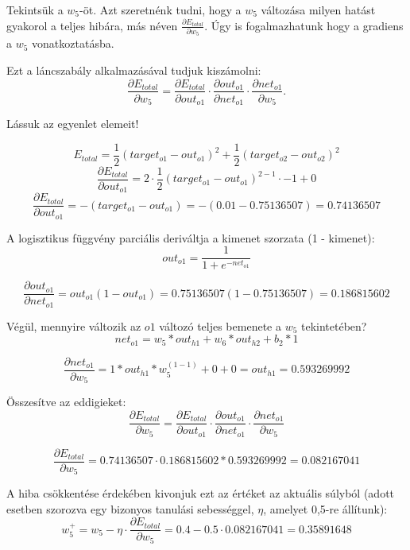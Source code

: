 Tekintsük a $w_5$-öt. Azt szeretnénk tudni, hogy a $w_5$ változása milyen hatást gyakorol a teljes hibára, más néven $\frac{\partial E_ {total}}{\partial w_ {5}}$. Úgy is fogalmazhatunk hogy a gradiens a $w_5$ vonatkoztatásba.

Ezt a láncszabály alkalmazásával tudjuk kiszámolni:
$$
\frac{\partial E_{total}}{\partial w_{5}} = \frac{\partial E_{total}}{\partial out_{o1}} \cdot \frac{\partial out_{o1}}{\partial net_{o1}} \cdot \frac{\partial net_{o1}}{\partial w_{5}}.
$$

Lássuk az egyenlet elemeit!
\begin{flushleft}
\begin{equation}
E_{total} = \frac{1}{2}(target_{o1} - out_{o1})^{2} + \frac{1}{2}(target_{o2} - out_{o2})^{2}
\end{equation}
\begin{equation}
\frac{\partial E_{total}}{\partial out_{o1}} = 2 \cdot \frac{1}{2}(target_{o1} - out_{o1})^{2 - 1} \cdot -1 + 0
\end{equation}
\begin{equation}
\frac{\partial E_{total}}{\partial out_{o1}} = -(target_{o1} - out_{o1}) = -(0.01 - 0.75136507) = 0.74136507
\end{equation}

\end{flushleft}

A logisztikus függvény parciális deriváltja a kimenet szorzata (1 - kimenet):
$$
out_{o1} = \frac{1}{1+e^{-net_{o1}}}
$$

$$
\frac{\partial out_{o1}}{\partial net_{o1}} = out_{o1}(1 - out_{o1}) = 0.75136507(1 - 0.75136507) = 0.186815602
$$

Végül, mennyire változik az $o1$ változó teljes bemenete a $w_5$ tekintetében?
$$
net_{o1} = w_5 * out_{h1} + w_6 * out_{h2} + b_2 * 1
$$

$$
\frac{\partial net_{o1}}{\partial w_{5}} = 1 * out_{h1} * w_5^{(1 - 1)} + 0 + 0 = out_{h1} = 0.593269992
$$

Összesítve az eddigieket:
$$
\frac{\partial E_{total}}{\partial w_{5}} = \frac{\partial E_{total}}{\partial out_{o1}} \cdot \frac{\partial out_{o1}}{\partial net_{o1}} \cdot \frac{\partial net_{o1}}{\partial w_{5}}
$$

$$
\frac{\partial E_{total}}{\partial w_{5}} = 0.74136507 \cdot 0.186815602 * 0.593269992 = 0.082167041
$$

A hiba csökkentése érdekében kivonjuk ezt az értéket az aktuális súlyból (adott esetben szorozva egy bizonyos tanulási sebességgel, $\eta$, amelyet 0,5-re állítunk):
$$
w_5^{+} = w_5 - \eta \cdot \frac{\partial E_{total}}{\partial w_{5}} = 0.4 - 0.5 \cdot 0.082167041 = 0.35891648
$$

